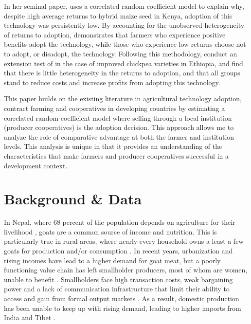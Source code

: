 \documentclass[11pt]{article}
\begin{document}
In her seminal paper, \citet{suri11} uses a correlated random coefficient model to explain why, despite high average returns to hybrid maize seed in Kenya, adoption of this technology was persistently low. By accounting for the unobserved heterogeneity of returns to adoption, \citet{suri11} demonstrates that farmers who experience positive benefits adopt the technology, while those who experience low returns choose not to adopt, or disadopt, the technology. Following this methodology, \citet{michler-et.al.18} conduct an extension test of \citet{suri11} in the case of improved chickpea varieties in Ethiopia, and find that there is little heterogeneity in the returns to adoption, and that all groups stand to reduce costs and increase profits from adopting this technology. 

This paper builds on the existing literature in agricultural technology adoption, contract farming and cooperatives in developing countries by estimating a correlated random coefficient model where selling through a local institution (producer cooperatives) is the adoption decision. This approach allows me to analyze the role of comparative advantage at both the farmer and institution levels. This analysis is unique in that it provides an understanding of the characteristics that make farmers and producer cooperatives successful in a development context. 
 

\section{Background \& Data} \label{sec:background}

In Nepal, where 68 percent of the population depends on agriculture for their livelihood \citep{ILO16}, goats are a common source of income and nutrition. This is particularly true in rural areas, where nearly every household owns a least a few goats for production and/or consumption \citep{upreti09}. In recent years, urbanization and rising incomes have lead to a higher demand for goat meat, but a poorly functioning value chain has left smallholder producers, most of whom are women, unable to benefit \citep{ashby-et.al.09,choudhary-et.al.11,gurung-et.al.15}. Smallholders face high transaction costs, weak bargaining power and a lack of communication infrastructure that limit their ability to access and gain from formal output markets \citep{ashby-et.al.09,kristjanson-et.al.14}. As a result, domestic production has been unable to keep up with rising demand, leading to higher imports from India and Tibet \citep{HI-N12}.
\end{document}
